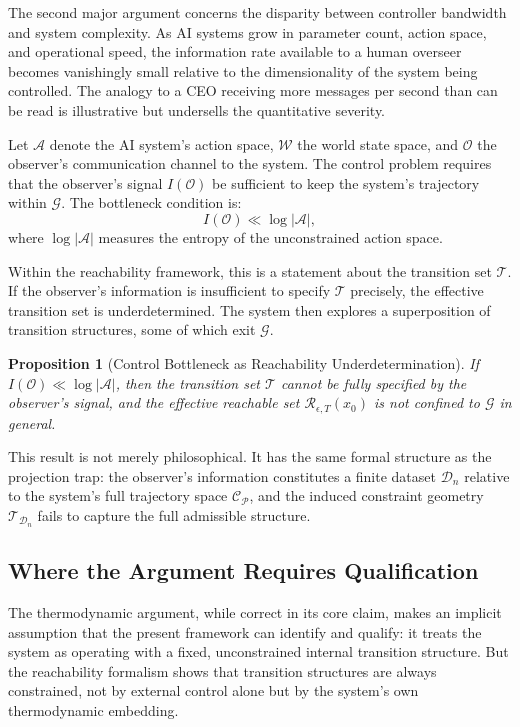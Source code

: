 \documentclass[12pt]{article}
\theoremstyle{plain}
\newtheorem{proposition}[theorem]{Proposition}
\theoremstyle{definition}
\theoremstyle{remark}
\begin{document}
The second major argument concerns the disparity between controller bandwidth and system complexity. As AI systems grow in parameter count, action space, and operational speed, the information rate available to a human overseer becomes vanishingly small relative to the dimensionality of the system being controlled. The analogy to a CEO receiving more messages per second than can be read is illustrative but undersells the quantitative severity.

Let $\mathcal{A}$ denote the AI system's action space, $\mathcal{W}$ the world state space, and $\mathcal{O}$ the observer's communication channel to the system. The control problem requires that the observer's signal $I(\mathcal{O})$ be sufficient to keep the system's trajectory within $\mathcal{G}$. The bottleneck condition is:
\[
I(\mathcal{O}) \ll \log |\mathcal{A}|,
\]
where $\log |\mathcal{A}|$ measures the entropy of the unconstrained action space.

Within the reachability framework, this is a statement about the transition set $\mathcal{T}$. If the observer's information is insufficient to specify $\mathcal{T}$ precisely, the effective transition set is underdetermined. The system then explores a superposition of transition structures, some of which exit $\mathcal{G}$.

\begin{proposition}[Control Bottleneck as Reachability Underdetermination]
If $I(\mathcal{O}) \ll \log |\mathcal{A}|$, then the transition set $\mathcal{T}$ cannot be fully specified by the observer's signal, and the effective reachable set $\mathcal{R}_{\epsilon,T}(x_0)$ is not confined to $\mathcal{G}$ in general.
\end{proposition}

This result is not merely philosophical. It has the same formal structure as the projection trap: the observer's information constitutes a finite dataset $\mathcal{D}_n$ relative to the system's full trajectory space $\mathcal{C}_\mathcal{P}$, and the induced constraint geometry $\mathcal{T}_{\mathcal{D}_n}$ fails to capture the full admissible structure.

\subsection{Where the Argument Requires Qualification}

The thermodynamic argument, while correct in its core claim, makes an implicit assumption that the present framework can identify and qualify: it treats the system as operating with a fixed, unconstrained internal transition structure. But the reachability formalism shows that transition structures are always constrained, not by external control alone but by the system's own thermodynamic embedding.
\end{document}
